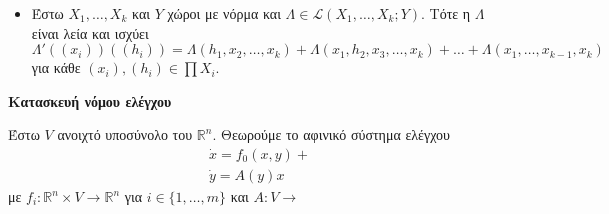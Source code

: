\begin{itemize}
    \item Έστω $X_1,\ldots,X_k$ και $Y$ χώροι με νόρμα και $\Lambda \in \mathcal{L}(X_1,\ldots,X_k; Y)$. Τότε η $\Lambda$ είναι λεία και ισχύει 
    \begin{equation*}
        \Lambda'\left((x_i)\right)\left((h_i)\right) = \Lambda(h_1, x_2,\ldots, x_k) + \Lambda(x_1, h_2, x_3, \ldots, x_k) + \ldots + \Lambda(x_1, \ldots, x_{k-1}, x_k)
    \end{equation*}
    για κάθε $(x_i),(h_i) \in \prod X_i$.
\end{itemize}

\textbf{Κατασκευή νόμου ελέγχου}

Έστω $V$ ανοιχτό υποσύνολο του $\mathbb{R}^n$. Θεωρούμε το αφινικό σύστημα ελέγχου 
\begin{gather*}
    \dot{x} = f_0(x, y) + \\
    \dot{y} = A(y)x
\end{gather*}
με $f_i: \mathbb{R}^n \times V \rightarrow \mathbb{R}^n$ για  $i \in \{1, \ldots, m\}$ και $A:V\rightarrow$
